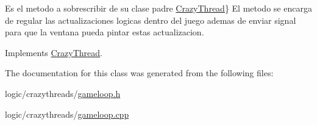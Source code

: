 Es el metodo a sobrescribir de su clase padre \hyperlink{class_crazy_thread}{Crazy\-Thread}\} El metodo se encarga de regular las actualizaciones logicas dentro del juego ademas de enviar signal para que la ventana pueda pintar estas actualizacion. 



Implements \hyperlink{class_crazy_thread_ac55ecbf9e17716a6dd9acd3f22e4ad80}{Crazy\-Thread}.



The documentation for this class was generated from the following files\-:\begin{DoxyCompactItemize}
\item 
logic/crazythreads/\hyperlink{gameloop_8h}{gameloop.\-h}\item 
logic/crazythreads/\hyperlink{gameloop_8cpp}{gameloop.\-cpp}\end{DoxyCompactItemize}
